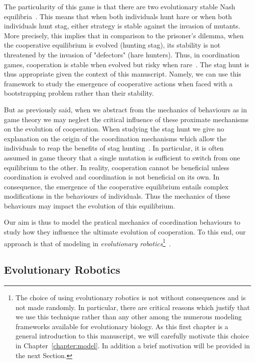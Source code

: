     The particularity of this game is that there are two evolutionary stable Nash equilibria~\parencite{Nash1950, MaynardSmith1973}. This means that when both individuals hunt hare or when both individuals hunt stag, either strategy is stable against the invasion of mutants. More precisely, this implies that in comparison to the prisoner's dilemma, when the cooperative equilibrium is evolved (hunting stag), its stability is not threatened by the invasion of "defectors" (hare hunters). Thus, in coordination games, cooperation is stable when evolved but risky when rare~\parencite{Forber2015}. The stag hunt is thus appropriate given the context of this manuscript. Namely, we can use this framework to study the emergence of cooperative actions when faced with a bootstrapping problem rather than their stability.

    But as previously said, when we abstract from the mechanics of behaviours as in game theory we may neglect the critical influence of these proximate mechanisms on the evolution of cooperation. When studying the stag hunt we give no explanation on the origin of the coordination mechanisms which allow the individuals to reap the benefits of stag hunting~\parencite{Calcott2007a}. In particular, it is often assumed in game theory that a single mutation is sufficient to switch from one equilibrium to the other. In reality, cooperation cannot be beneficial unless coordination is evolved and coordination is not beneficial on its own. In consequence, the emergence of the cooperative equilibrium entails complex modifications in the behaviours of individuals. Thus the mechanics of these behaviours may impact the evolution of this equilibrium.

    Our aim is thus to model the pratical mechanics of coordination behaviours to study how they influence the ultimate evolution of cooperation. To this end, our approach is that of modeling in \emph{evolutionary robotics}\footnote{The choice of using evolutionary robotics is not without consequences and is not made randomly. In particular, there are critical reasons which justify that we use this technique rather than any other among the numerous modeling frameworks available for evolutionary biology. As this first chapter is a general introduction to this manuscript, we will carefully motivate this choice in Chapter~\ref{chapter:model}. In addition a brief motivation will be provided in the next Section.}~\parencite{Nolfi2000}.


  \subsection{Evolutionary Robotics}

